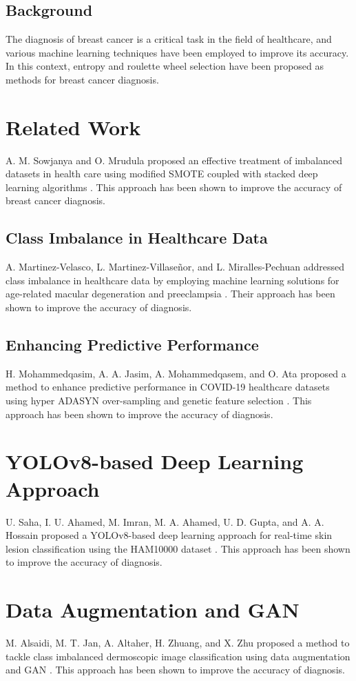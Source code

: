 \documentclass[final,5p,times,twocolumn,authoryear]{elsarticle}
\begin{document}
\subsection{Background}
The diagnosis of breast cancer is a critical task in the field of healthcare, and various machine learning techniques have been employed to improve its accuracy. In this context, entropy and roulette wheel selection have been proposed as methods for breast cancer diagnosis.
\section{Related Work}
A. M. Sowjanya and O. Mrudula proposed an effective treatment of imbalanced datasets in health care using modified SMOTE coupled with stacked deep learning algorithms \cite{ref1}. This approach has been shown to improve the accuracy of breast cancer diagnosis.
\subsection{Class Imbalance in Healthcare Data}
A. Martinez-Velasco, L. Martinez-Villaseñor, and L. Miralles-Pechuan addressed class imbalance in healthcare data by employing machine learning solutions for age-related macular degeneration and preeclampsia \cite{ref2}. Their approach has been shown to improve the accuracy of diagnosis.
\subsection{Enhancing Predictive Performance}
H. Mohammedqasim, A. A. Jasim, A. Mohammedqasem, and O. Ata proposed a method to enhance predictive performance in COVID-19 healthcare datasets using hyper ADASYN over-sampling and genetic feature selection \cite{ref3}. This approach has been shown to improve the accuracy of diagnosis.
\section{YOLOv8-based Deep Learning Approach}
U. Saha, I. U. Ahamed, M. Imran, M. A. Ahamed, U. D. Gupta, and A. A. Hossain proposed a YOLOv8-based deep learning approach for real-time skin lesion classification using the HAM10000 dataset \cite{ref4}. This approach has been shown to improve the accuracy of diagnosis.
\section{Data Augmentation and GAN}
M. Alsaidi, M. T. Jan, A. Altaher, H. Zhuang, and X. Zhu proposed a method to tackle class imbalanced dermoscopic image classification using data augmentation and GAN \cite{ref5}. This approach has been shown to improve the accuracy of diagnosis.
\end{document}
